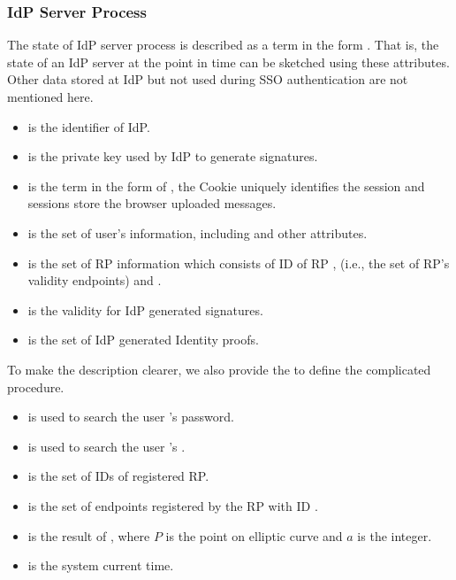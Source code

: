 \subsubsection{IdP Server Process}
The state of IdP server process is described as a term in the form .
That is,  the state of an IdP server  at the point in time can be sketched using these attributes.
Other data stored at IdP but not used during SSO authentication are not mentioned here.
\begin{itemize}
\setlength\itemsep{-2pt}
\item {} is the identifier of IdP.
\item {} is the private key used by IdP to generate signatures.
\item {} is the term in the form of , the Cookie uniquely identifies the session and sessions store the  browser uploaded messages.
\item {} is the set of user's information, including    and other attributes.
\item {} is the set of RP information which consists of ID of RP ,  (i.e., the set of RP's validity endpoints) and .
\item {} is the validity for IdP generated signatures.
\item {} is the set of IdP generated Identity proofs.
\end{itemize}
To make the description clearer, we also provide the  to define the complicated procedure.
\begin{itemize}
\setlength\itemsep{-2pt}
\item {} is used to search the user 's password.
\item {} is used to search the user 's .
\item {} is the set of IDs of registered RP.
\item {} is the set of endpoints registered by the RP with ID .
\item {} is the result of , where $P$ is the point on elliptic curve and $a$ is the integer.
\item {} is the system current time.
\end{itemize}

